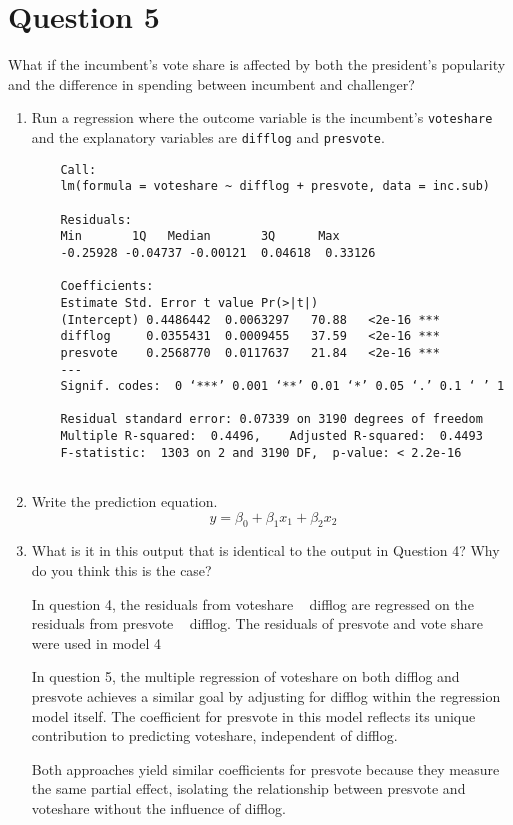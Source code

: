\documentclass[12pt,letterpaper]{article}
\begin{document}
	\newpage	

\section*{Question 5}
\noindent What if the incumbent's vote share is affected by both the president's popularity and the difference in spending between incumbent and challenger? 
	\begin{enumerate}
		\item Run a regression where the outcome variable is the incumbent's \texttt{voteshare} and the explanatory variables are \texttt{difflog} and \texttt{presvote}.
			 
			\begin{BVerbatim}
	Call:
	lm(formula = voteshare ~ difflog + presvote, data = inc.sub)
	
	Residuals:
	Min       1Q   Median       3Q      Max 
	-0.25928 -0.04737 -0.00121  0.04618  0.33126 
	
	Coefficients:
	Estimate Std. Error t value Pr(>|t|)    
	(Intercept) 0.4486442  0.0063297   70.88   <2e-16 ***
	difflog     0.0355431  0.0009455   37.59   <2e-16 ***
	presvote    0.2568770  0.0117637   21.84   <2e-16 ***
	---
	Signif. codes:  0 ‘***’ 0.001 ‘**’ 0.01 ‘*’ 0.05 ‘.’ 0.1 ‘ ’ 1
	
	Residual standard error: 0.07339 on 3190 degrees of freedom
	Multiple R-squared:  0.4496,	Adjusted R-squared:  0.4493 
	F-statistic:  1303 on 2 and 3190 DF,  p-value: < 2.2e-16
				
			\end{BVerbatim}
			\vspace{5cm}
		\item Write the prediction equation.
	\begin{equation}
		\ y = \beta_0 + \beta_1 x_1+\beta_2 x_2
	\end{equation}
			\vspace{5cm}
		\item What is it in this output that is identical to the output in Question 4? Why do you think this is the case?
		
In question 4, the residuals from voteshare ~ difflog are regressed on the residuals from presvote ~ difflog. The residuals of presvote and vote share were used in model 4

In question 5, the multiple regression of voteshare on both difflog and presvote achieves a similar goal by adjusting for difflog within the regression model itself. The coefficient for presvote in this model reflects its unique contribution to predicting voteshare, independent of difflog.

Both approaches yield similar coefficients for presvote because they measure the same partial effect, isolating the relationship between presvote and voteshare without the influence of difflog.

	\end{enumerate}
\end{document}

